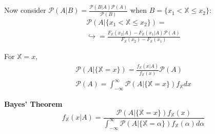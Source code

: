 \documentclass{article}
\renewcommand{\P}{\mathcal{P}}
\providecommand{\X}{\mathbb{X}}
\begin{document}
\begin{multicols*}{3}
        \newpage
        Now consider $\P(A|B) = \frac{\P(B|A)\P(A)}{\P(B)}$ when $B=\{x_1<\X\leq x_2\}$:
        \begin{equation*}
            \begin{gathered}
                \P(A|\{x_1<\X\leq x_2\}) = \\
                \hookrightarrow = \frac{F_\X (x_2|A) - F_\X (x_1|A)\P(A)}{F_\X(x_2) - F_\X(x_1)}
            \end{gathered}
        \end{equation*}

        For $\X=x$,
        \begin{equation*}
            \begin{gathered}
                \P(A|\{\X=x\}) = \frac{f_\X(x|A)}{f_\X(x)}\P(A)\\
                \P(A)= \int_{-\infty}^{\infty} \P(A|\{\X=x\})f_{\X}dx
            \end{gathered}
        \end{equation*}

        \textbf{Bayes' Theorem}
        \begin{equation*}
            f_{\X}(x|A) = \frac{\P(A|\{\X=x\})f_\X(x)}{\int_{-\infty}^{\infty}\P(A|\{\X=\alpha\})f_\X(\alpha)d\alpha }
        \end{equation*}

    \end{multicols*}
\end{document}

